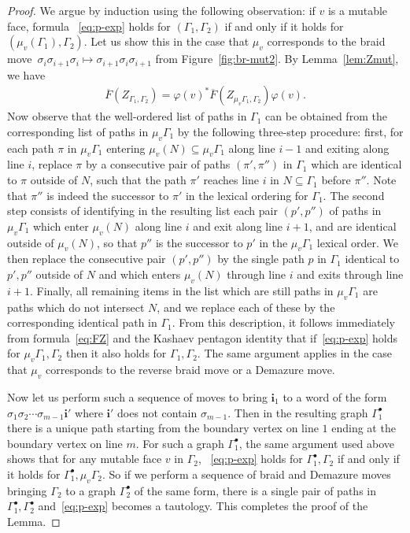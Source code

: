 \documentclass[11pt, reqno]{amsart}
\theoremstyle{definition}
\numberwithin{equation}{section}
\begin{document}
\begin{proof}
We argue by induction using the following observation: if $v$ is a mutable face, formula ~\eqref{eq:p-exp} holds for $(\Gamma_1,\Gamma_2)$ if and only if it holds for $(\mu_v(\Gamma_1),\Gamma_2)$. Let us show this in the case that $\mu_v$ corresponds to the braid move~$\sigma_{i}\sigma_{i+1}\sigma_{i}\mapsto\sigma_{i+1}\sigma_{i}\sigma_{i+1}$ from Figure~\ref{fig:br-mut2}. By Lemma~\ref{lem:Zmut}, we have
\begin{align}
\label{eq:FZ}
\overline{F}(Z_{\Gamma_1,\Gamma_2}) = \varphi(v)^*\overline{F}(Z_{\mu_v\Gamma_1,\Gamma_2})\varphi(v).
\end{align}
Now observe that the well-ordered list of paths in $\Gamma_1$ can be obtained from the corresponding list of paths in $\mu_v\Gamma_1$ by the following three-step procedure: first, for each path $\pi$ in $\mu_v\Gamma_1$ entering $\mu_v(N)\subseteq\mu_v\Gamma_1$ along line $i-1$ and exiting along line $i$, replace $\pi$ by a consecutive pair of paths $(\pi',\pi'')$ in $\Gamma_1$ which are identical to $\pi$ outside of $N$, such that the path $\pi'$ reaches line $i$ in $N\subseteq\Gamma_1$ before $\pi''$. Note that $\pi''$ is indeed the successor to $\pi'$ in the lexical ordering for $\Gamma_1$. The second step consists of identifying in the resulting list  each pair $(p',p'')$ of paths in $\mu_v\Gamma_1$ which enter $\mu_v(N)$ along line $i$ and exit along line $i+1$, and are identical outside of $\mu_v(N)$, so that $p''$ is the successor to $p'$ in the $\mu_v\Gamma_1$ lexical order. We then replace the consecutive pair $(p',p'')$ by the single path $p$ in $\Gamma_1$ identical to $p',p''$ outside of $N$ and which enters $\mu_v(N)$ through line $i$ and exits through line $i+1$. Finally, all remaining items in the list which are still paths in $\mu_v\Gamma_1$ are paths which do not intersect $N$, and we replace each of these by the corresponding identical path in $\Gamma_1$. From this description, it follows immediately from formula~\eqref{eq:FZ} and the Kashaev pentagon identity that if~\eqref{eq:p-exp} holds for $\mu_v\Gamma_1,\Gamma_2$ then it also holds for $\Gamma_1,\Gamma_2$. The same argument applies in the case that $\mu_v$ corresponds to the reverse braid move or a Demazure move.

Now let us perform such a sequence of moves to bring $\mathbf{i}_1$ to a word of the form $\sigma_1\sigma_2\cdots \sigma_{m-1}\mathbf{i}'$ where $\mathbf{i}'$ does not contain $\sigma_{m-1}$. Then in the resulting graph $\Gamma_1^\bullet$ there is a unique path starting from the boundary vertex on line $1$ ending at the boundary vertex on line $m$. For such a graph $\Gamma_1^\bullet$, the same argument used above shows that for any mutable face $v$ in $\Gamma_2$, ~\eqref{eq:p-exp} holds for $\Gamma_1^\bullet,\Gamma_2$ if and only if it holds for $\Gamma_1^\bullet,\mu_v\Gamma_2$.
So if we perform a sequence of braid and Demazure moves bringing $\Gamma_2$ to a graph $\Gamma_2^\bullet$ of the same form, there is a single pair of paths in $\Gamma_1^\bullet,\Gamma^\bullet_2$ and~\eqref{eq:p-exp} becomes a tautology. This completes the proof of the Lemma. 
\end{proof}
\end{document}
